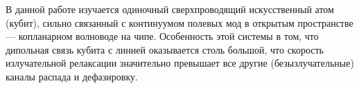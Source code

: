 В данной работе изучается одиночный сверхпроводящий искусственный атом (кубит), сильно связанный с континуумом полевых мод в открытым пространстве --- копланарном волноводе на чипе. Особенность этой системы в том, что дипольная связь кубита с линией оказывается столь большой, что скорость излучательной релаксации значительно превышает все другие (безызлучательные) каналы распада и дефазировку. 

%
%

